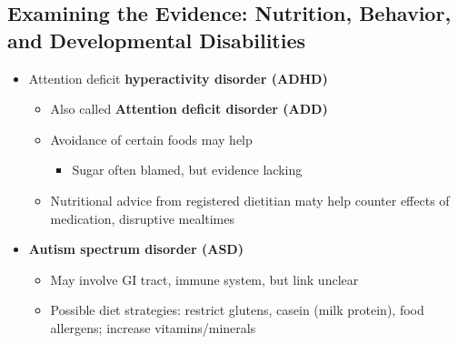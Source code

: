 \documentclass[12pt]{article}
\begin{document}
        \subsection{Examining the Evidence: Nutrition, Behavior, and Developmental Disabilities}
            \begin{itemize}
                \item Attention deficit \textbf{hyperactivity disorder (ADHD)}
                    \begin{itemize}
                        \item Also called \textbf{Attention deficit disorder (ADD)}
                        \item Avoidance of certain foods may help
                            \begin{itemize}
                                \item Sugar often blamed, but evidence lacking
                            \end{itemize}
                        \item Nutritional advice from registered dietitian maty help counter effects of medication, disruptive mealtimes
                    \end{itemize}
                \item \textbf{Autism spectrum disorder (ASD)}
                    \begin{itemize}
                        \item May involve GI tract, immune system, but link unclear
                        \item Possible diet strategies: restrict glutens, casein (milk protein), food allergens; increase vitamins/minerals
                    \end{itemize}
            \end{itemize}
\end{document}
